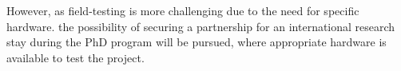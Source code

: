\documentclass[12pt, a4paper]{article}
\begin{document}
However,
as field-testing is more challenging due to the need for specific hardware.
the possibility of securing a partnership for an international research stay during the PhD program will be pursued,
where appropriate hardware is available to test the project.
%
%



\end{document}
